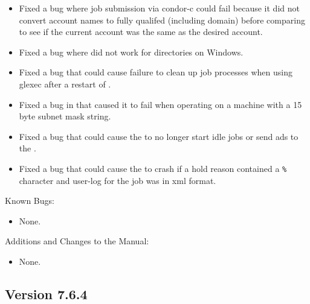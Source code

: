 \begin{itemize}
\item Fixed a bug where job submission via condor-c could fail because it did not
convert account names to fully qualifed (including domain) before comparing to see
if the current account was the same as the desired account.

\item Fixed a bug where  did not work for directories on Windows.

\item Fixed a bug that could cause failure to clean up job processes
when using glexec after a restart of .

\item Fixed a bug in  that caused it to fail when
operating on a machine with a 15 byte subnet mask string.

\item Fixed a bug that could cause the  to no longer start
idle jobs or send ads to the .

\item Fixed a bug that could cause the  to crash if a
hold reason contained a \verb|%| character and user-log for the job
was in xml format.

\end{itemize}

\noindent Known Bugs:

\begin{itemize}

\item None.

\end{itemize}

\noindent Additions and Changes to the Manual:

\begin{itemize}

\item None.

\end{itemize}


\subsection*{\label{sec:New-7-6-4}Version 7.6.4}

